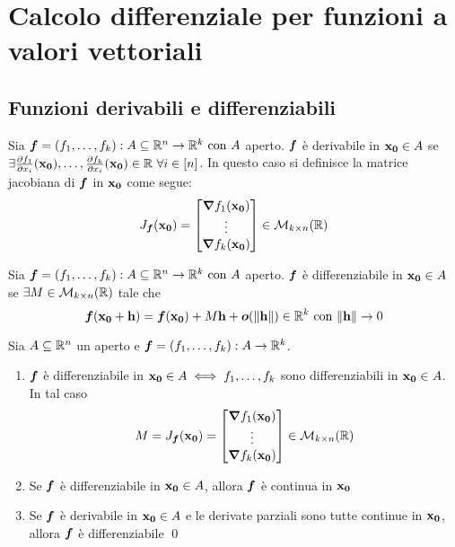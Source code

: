 \chapter{Calcolo differenziale per funzioni a valori vettoriali}

\section{Funzioni derivabili e differenziabili}

\begin{definition}
    Sia $\bm f=(f_1,\dots,f_k): A\subseteq \mathbb{R}^n \to \mathbb{R}^k \text{ con } A$ aperto. $\bm f$ è derivabile in $\vb{x_0} \in A$ se $\exists \frac{\partial f_1}{\partial x_i}(\vb{x_0}),\dots,\frac{\partial f_k}{\partial x_i}(\vb{x_0}) \in \mathbb{R} \ \forall i \in [n]$. In questo caso si definisce la matrice jacobiana di $\bm f$ in $\vb{x_0}$ come segue:
    $$
        J_{\bm f}(\vb{x_0})=
        \begin{bmatrix}
            \grad f_1 (\vb{x_0})\\
            \vdots \\
            \grad f_k (\vb{x_0})
        \end{bmatrix}
        \in \mathcal{M}_{k\times n}(\mathbb{R})
    $$
\end{definition}

\begin{definition}
    Sia $\bm f=(f_1,\dots,f_k): A\subseteq \mathbb{R}^n \to \mathbb{R}^k \text{ con } A$ aperto. $\bm f$ è differenziabile in $\vb{x_0} \in A$ se $\exists M \in \mathcal{M}_{k\times n}(\mathbb{R})$ tale che
    $$
        \bm f(\vb{x_0} + \vb{h})= \bm f(\vb{x_0}) + M\vb{h} + \bm o (\norm{\vb{h}}) \in \mathbb{R}^k \text{ con } \norm{\vb{h}}\to 0
    $$
\end{definition}

\begin{theorem}
    Sia $A \subseteq \mathbb{R}^n$ un aperto e $\bm f= (f_1,\dots,f_k):A \to \mathbb{R}^k$.
    \begin{enumerate}
        \item $\bm f$ è differenziabile in $\vb{x_0} \in A \iff f_1,\dots,f_k$ sono differenziabili in $\vb{x_0} \in A$. In tal caso
        $$
            M=J_{\bm f}(\vb{x_0})=
            \begin{bmatrix}
                \grad f_1(\vb{x_0})\\
                \vdots\\
                \grad f_k(\vb{x_0})
            \end{bmatrix}
            \in \mathcal{M}_{k\times n}(\mathbb{R})
        $$
        \item Se $\bm f$ è differenziabile in $\vb{x_0} \in A$, allora $\bm f$ è continua in $\vb{x_0}$
        \item Se $\bm f$ è derivabile in $\vb{x_0} \in A$ e le derivate parziali sono tutte continue in $\vb{x_0}$, allora $\bm f$ è differenziabile
        \qed
    \end{enumerate}
\end{theorem}

